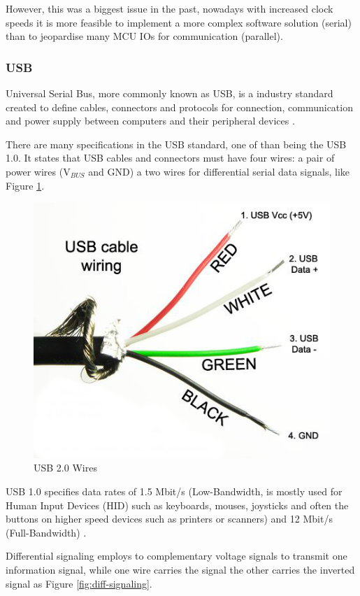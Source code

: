 	However, this was a biggest issue in the past, nowadays with increased clock speeds it is more feasible to implement a more complex software solution (serial) than to jeopardise many MCU IOs for communication (parallel).


\subsubsection{USB}\label{sssec:usb}
	Universal Serial Bus, more commonly known as USB, is a industry standard created to define cables, connectors and protocols for connection, communication and power supply between computers and their peripheral devices \cite{garfinkel1995usb}.
	\par
	There are many specifications in the USB standard, one of than being the USB 1.0. It states that USB cables and connectors must have four wires: a pair of power wires (V$_{BUS}$ and GND) a two wires for differential serial data signals, like Figure \ref{fig:usb2.0-wires}.
	

		\begin{figure}[htbp]
			\centering
				\includegraphics[scale=0.8]{figuras/fig-usb2-0-wires}
			\caption{USB 2.0 Wires \cite{usb2.0-wires}}
			\label{fig:usb2.0-wires}
		\end{figure}

	USB 1.0 specifies data rates of 1.5 Mbit/s (Low-Bandwidth, is mostly used for Human Input Devices (HID) such as keyboards, mouses, joysticks and often the buttons on higher speed devices such as printers or scanners) and 12 Mbit/s (Full-Bandwidth) \cite{specification91}.
	\par
	Differential signaling employs to complementary voltage signals to transmit one information signal, while one wire carries the signal the other carries the inverted signal \cite{diffkinnaird} as Figure \ref{fig:diff-signaling}.


